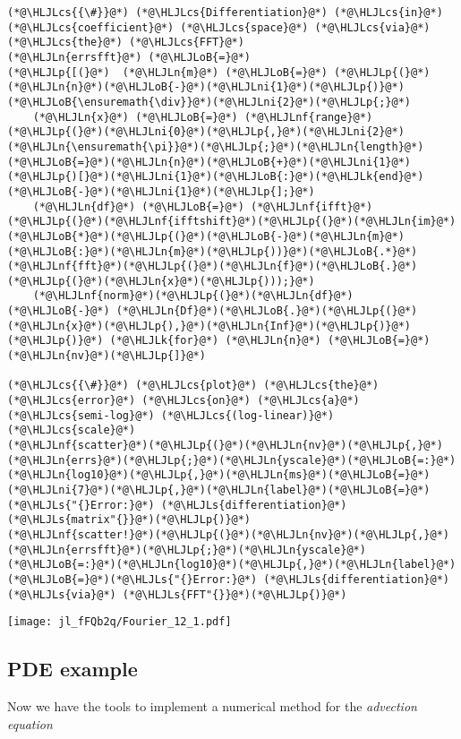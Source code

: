 \documentclass[12pt,a4paper]{article}
\newcommand{\HLJLk}[1]{\textcolor[RGB]{148,91,176}{\textbf{#1}}}
\newcommand{\HLJLn}[1]{#1}
\newcommand{\HLJLnf}[1]{\textcolor[RGB]{66,102,213}{#1}}
\newcommand{\HLJLs}[1]{\textcolor[RGB]{201,61,57}{#1}}
\newcommand{\HLJLni}[1]{\textcolor[RGB]{59,151,46}{#1}}
\newcommand{\HLJLoB}[1]{\textcolor[RGB]{102,102,102}{\textbf{#1}}}
\newcommand{\HLJLp}[1]{#1}
\newcommand{\HLJLcs}[1]{\textcolor[RGB]{153,153,119}{\textit{#1}}}
\begin{document}
\begin{lstlisting}
(*@\HLJLcs{{\#}}@*) (*@\HLJLcs{Differentiation}@*) (*@\HLJLcs{in}@*) (*@\HLJLcs{coefficient}@*) (*@\HLJLcs{space}@*) (*@\HLJLcs{via}@*) (*@\HLJLcs{the}@*) (*@\HLJLcs{FFT}@*)
(*@\HLJLn{errsfft}@*) (*@\HLJLoB{=}@*) 
(*@\HLJLp{[(}@*)  (*@\HLJLn{m}@*) (*@\HLJLoB{=}@*) (*@\HLJLp{(}@*)(*@\HLJLn{n}@*)(*@\HLJLoB{-}@*)(*@\HLJLni{1}@*)(*@\HLJLp{)}@*)(*@\HLJLoB{\ensuremath{\div}}@*)(*@\HLJLni{2}@*)(*@\HLJLp{;}@*)
    (*@\HLJLn{x}@*) (*@\HLJLoB{=}@*) (*@\HLJLnf{range}@*)(*@\HLJLp{(}@*)(*@\HLJLni{0}@*)(*@\HLJLp{,}@*)(*@\HLJLni{2}@*)(*@\HLJLn{\ensuremath{\pi}}@*)(*@\HLJLp{;}@*)(*@\HLJLn{length}@*)(*@\HLJLoB{=}@*)(*@\HLJLn{n}@*)(*@\HLJLoB{+}@*)(*@\HLJLni{1}@*)(*@\HLJLp{)[}@*)(*@\HLJLni{1}@*)(*@\HLJLoB{:}@*)(*@\HLJLk{end}@*)(*@\HLJLoB{-}@*)(*@\HLJLni{1}@*)(*@\HLJLp{];}@*)
    (*@\HLJLn{df}@*) (*@\HLJLoB{=}@*) (*@\HLJLnf{ifft}@*)(*@\HLJLp{(}@*)(*@\HLJLnf{ifftshift}@*)(*@\HLJLp{(}@*)(*@\HLJLn{im}@*)(*@\HLJLoB{*}@*)(*@\HLJLp{(}@*)(*@\HLJLoB{-}@*)(*@\HLJLn{m}@*)(*@\HLJLoB{:}@*)(*@\HLJLn{m}@*)(*@\HLJLp{))}@*)(*@\HLJLoB{.*}@*)(*@\HLJLnf{fft}@*)(*@\HLJLp{(}@*)(*@\HLJLn{f}@*)(*@\HLJLoB{.}@*)(*@\HLJLp{(}@*)(*@\HLJLn{x}@*)(*@\HLJLp{)));}@*)
    (*@\HLJLnf{norm}@*)(*@\HLJLp{(}@*)(*@\HLJLn{df}@*) (*@\HLJLoB{-}@*) (*@\HLJLn{Df}@*)(*@\HLJLoB{.}@*)(*@\HLJLp{(}@*)(*@\HLJLn{x}@*)(*@\HLJLp{),}@*)(*@\HLJLn{Inf}@*)(*@\HLJLp{)}@*) (*@\HLJLp{)}@*) (*@\HLJLk{for}@*) (*@\HLJLn{n}@*) (*@\HLJLoB{=}@*) (*@\HLJLn{nv}@*)(*@\HLJLp{]}@*)

(*@\HLJLcs{{\#}}@*) (*@\HLJLcs{plot}@*) (*@\HLJLcs{the}@*) (*@\HLJLcs{error}@*) (*@\HLJLcs{on}@*) (*@\HLJLcs{a}@*) (*@\HLJLcs{semi-log}@*) (*@\HLJLcs{(log-linear)}@*) (*@\HLJLcs{scale}@*)
(*@\HLJLnf{scatter}@*)(*@\HLJLp{(}@*)(*@\HLJLn{nv}@*)(*@\HLJLp{,}@*)(*@\HLJLn{errs}@*)(*@\HLJLp{;}@*)(*@\HLJLn{yscale}@*)(*@\HLJLoB{=:}@*)(*@\HLJLn{log10}@*)(*@\HLJLp{,}@*)(*@\HLJLn{ms}@*)(*@\HLJLoB{=}@*)(*@\HLJLni{7}@*)(*@\HLJLp{,}@*)(*@\HLJLn{label}@*)(*@\HLJLoB{=}@*)(*@\HLJLs{"{}Error:}@*) (*@\HLJLs{differentiation}@*) (*@\HLJLs{matrix"{}}@*)(*@\HLJLp{)}@*)
(*@\HLJLnf{scatter!}@*)(*@\HLJLp{(}@*)(*@\HLJLn{nv}@*)(*@\HLJLp{,}@*)(*@\HLJLn{errsfft}@*)(*@\HLJLp{;}@*)(*@\HLJLn{yscale}@*)(*@\HLJLoB{=:}@*)(*@\HLJLn{log10}@*)(*@\HLJLp{,}@*)(*@\HLJLn{label}@*)(*@\HLJLoB{=}@*)(*@\HLJLs{"{}Error:}@*) (*@\HLJLs{differentiation}@*) (*@\HLJLs{via}@*) (*@\HLJLs{FFT"{}}@*)(*@\HLJLp{)}@*)
\end{lstlisting}

\texttt{[image: jl\_fFQb2q/Fourier\_12\_1.pdf]}

\subsection{PDE example}
Now we have the tools to implement a numerical method for the \emph{advection equation}
\end{document}
